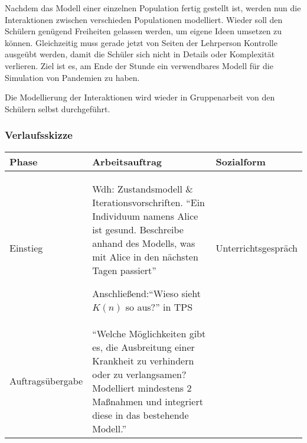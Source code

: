 Nachdem das Modell einer einzelnen Population fertig gestellt ist, werden nun die Interaktionen zwischen verschieden Populationen modelliert. Wieder soll den Schülern genügend Freiheiten gelassen werden, um eigene Ideen umsetzen zu können. Gleichzeitig muss gerade jetzt von Seiten der Lehrperson Kontrolle ausgeübt werden, damit die Schüler sich nicht in Details oder Komplexität verlieren. Ziel ist es, am Ende der Stunde ein verwendbares Modell für die Simulation von Pandemien zu haben. 

Die Modellierung der Interaktionen wird wieder in Gruppenarbeit von den Schülern selbst durchgeführt. 

\begin{landscape}
\subsubsection{Verlaufsskizze}
\noindent
\begin{longtable}{|C{0.3\textwidth}|L{0.8\textwidth}|L{0.4\textwidth}|}
\hline
Phase & Arbeitsauftrag & Sozialform\\
\hline\hline
\endhead
\hline
\endfoot
Einstieg& Wdh: Zustandsmodell \& Iterationsvorschriften. ``Ein Individuum namens Alice ist gesund. Beschreibe anhand des Modells, was mit Alice in den nächsten Tagen passiert''

Anschließend:``Wieso sieht $K(n)$ so aus?'' in TPS& Unterrichtsgespräch\\\hline
Auftragsübergabe&``Welche Möglichkeiten gibt es, die Ausbreitung einer Krankheit zu verhindern oder zu verlangsamen? Modelliert mindestens 2 Maßnahmen und integriert diese in das bestehende Modell.''


\end{longtable}
\end{landscape}
